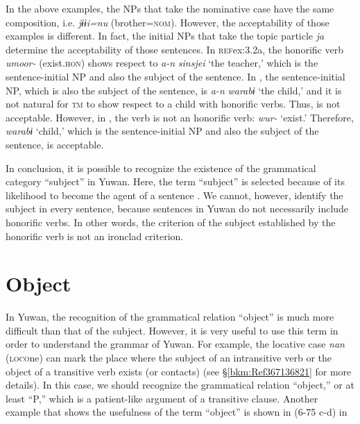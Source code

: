In the above examples, the NPs that take the nominative case have the same composition, i.e. \textit{jɨɨi=nu} (brother=\textsc{nom}). However, the acceptability of those examples is different. In fact, the initial NPs that take the topic particle \textit{ja} determine the acceptability of those sentences. In \textsc{ref}{ex:3.2a}, the honorific verb \textit{umoor-} (exist.\textsc{hon}) shows respect to \textit{a-n} \textit{sinsjei} ‘the teacher,’ which is the sentence-initial NP and also the subject of the sentence. In , the sentence-initial NP, which is also the subject of the sentence, is \textit{a-n} \textit{warabɨ} ‘the child,’ and it is not natural for \textsc{tm} to show respect to a child with honorific verbs. Thus,  is not acceptable. However, in , the verb is not an honorific verb: \textit{wur-} ‘exist.’ Therefore, \textit{warabɨ} ‘child,’ which is the sentence-initial NP and also the subject of the sentence, is acceptable.

In conclusion, it is possible to recognize the existence of the grammatical category “subject” in Yuwan. Here, the term “subject” is selected because of its likelihood to become the agent of a sentence \citep[cf.][136]{Andrews2007}. We cannot, however, identify the subject in every sentence, because sentences in Yuwan do not necessarily include honorific verbs. In other words, the criterion of the subject established by the honorific verb is not an ironclad criterion.

\section{Object}
\label{bkm:Ref350115710}\hypertarget{RefHeadingToc395696989}{}
In Yuwan, the recognition of the grammatical relation “object” is much more difficult than that of the subject. However, it is very useful to use this term in order to understand the grammar of Yuwan. For example, the locative case \textit{nan} (\textsc{loco}ne) can mark the place where the subject of an intransitive verb or the object of a transitive verb exists (or contacts) (see §\ref{bkm:Ref367136821} for more details). In this case, we should recognize the grammatical relation “object,” or at least “P,” which is a patient-like argument of a transitive clause. Another example that shows the usefulness of the term “object” is shown in (6-75 c-d) in 
